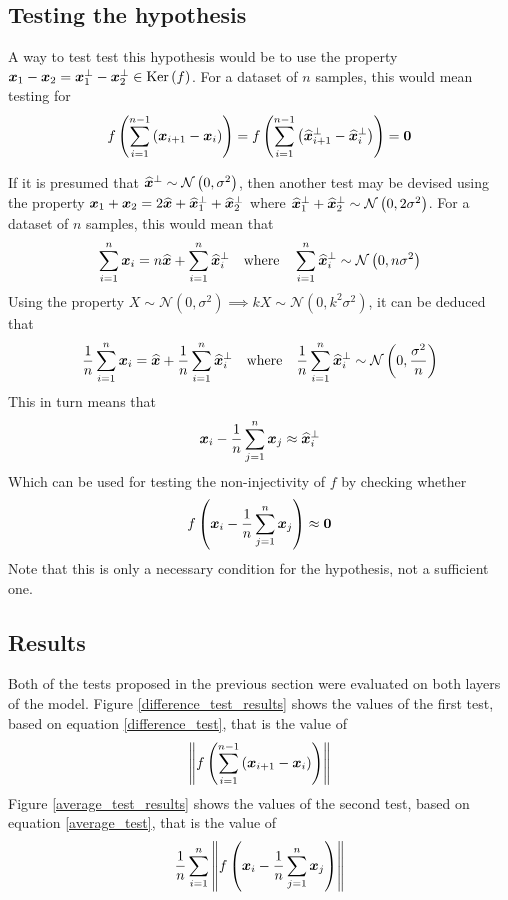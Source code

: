 \subsection{Testing the hypothesis}

A way to test test this hypothesis would be to use the property \( \bm{x}_1 - \bm{x}_2 = \bm{x}_1^\perp - \bm{x}_2^\perp \in \mathrm{Ker} \left( f \right) \). For a dataset of \( n \) samples, this would mean testing for
\begin{equation}\label{difference_test}
	f \left( \sum_{i = 1}^{n - 1} \left( \bm{x}_{i + 1} - \bm{x}_i \right) \right) = f \left( \sum_{i = 1}^{n - 1} \left( \widehat{\bm{x}}_{i + 1}^\perp - \widehat{\bm{x}}_i^\perp \right) \right) = \bm{0}
\end{equation}

If it is presumed that \( \widehat{\bm{x}}^\perp \sim \mathcal{N} \left(0, \sigma^2 \right) \), then another test may be devised using the property \( \bm{x}_1 + \bm{x}_2 = 2 \widehat{\bm{x}} + \widehat{\bm{x}}_1^\perp + \widehat{\bm{x}}_2^\perp \) where \( \widehat{\bm{x}}_1^\perp + \widehat{\bm{x}}_2^\perp \sim \mathcal{N} \left( 0, 2 \sigma^2 \right) \). For a dataset of \( n \) samples, this would mean that
\[ \sum_{i = 1}^n \bm{x}_i = n \widehat{\bm{x}} + \sum_{i = 1}^n \widehat{\bm{x}}_i^\perp \quad \text{where} \quad \sum_{i = 1}^n \widehat{\bm{x}}_i^\perp \sim \mathcal{N} \left( 0, n \sigma^2 \right) \]
Using the property \( X \sim \mathcal{N} \left( 0, \sigma^2 \right) \implies kX \sim \mathcal{N} \left( 0, k^2 \sigma^2 \right) \), it can be deduced that
\[ \frac{1}{n}\sum_{i = 1}^n \bm{x}_i = \widehat{\bm{x}} + \frac{1}{n}\sum_{i = 1}^n \widehat{\bm{x}}_i^\perp \quad \text{where} \quad \frac{1}{n}\sum_{i = 1}^n \widehat{\bm{x}}_i^\perp \sim \mathcal{N} \left( 0, \frac{\sigma^2}{n} \right) \]
This in turn means that
\[ \bm{x}_i - \frac{1}{n}\sum_{j = 1}^n \bm{x}_j \approx \widehat{\bm{x}}_i^\perp \]
Which can be used for testing the non-injectivity of \( f \) by checking whether
\begin{equation}\label{average_test}
	f \left( \bm{x}_i - \frac{1}{n}\sum_{j = 1}^n \bm{x}_j \right) \approx \bm{0}
\end{equation}
Note that this is only a necessary condition for the hypothesis, not a sufficient one.

\subsection{Results}
Both of the tests proposed in the previous section were evaluated on both layers of the model. Figure \ref{difference_test_results} shows the values of the first test, based on equation \ref{difference_test}, that is the value of
\[ \left\lVert f \left( \sum_{i = 1}^{n - 1} \left( \bm{x}_{i + 1} - \bm{x}_i \right) \right) \right\rVert \]
Figure \ref{average_test_results} shows the values of the second test, based on equation \ref{average_test}, that is the value of
\[ \frac{1}{n} \sum_{i = 1}^n \left\lVert f \left( \bm{x}_i - \frac{1}{n} \sum_{j = 1}^n \bm{x}_j \right) \right\rVert \]

